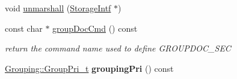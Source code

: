 \begin{DoxyCompactItemize}
\item 
void \mbox{\hyperlink{class_entry_a0c2561181c63aad06955b06211667683}{unmarshall}} (\mbox{\hyperlink{class_storage_intf}{Storage\+Intf}} $\ast$)
\item 
\mbox{\label{class_entry_ac8c9f7d087934e1151f4cc26b556a2f1}} 
const char $\ast$ \mbox{\hyperlink{class_entry_ac8c9f7d087934e1151f4cc26b556a2f1}{group\+Doc\+Cmd}} () const
\begin{DoxyCompactList}\small\item\em return the command name used to define G\+R\+O\+U\+P\+D\+O\+C\+\_\+\+S\+EC \end{DoxyCompactList}\item 
\mbox{\label{class_entry_a8aeb339b46f8827e0345a917e3302ba3}} 
\mbox{\hyperlink{struct_grouping_a9f0ec5ab376b083ebe3274ea79fd2d70}{Grouping\+::\+Group\+Pri\+\_\+t}} {\bfseries grouping\+Pri} () const
\end{DoxyCompactItemize}
